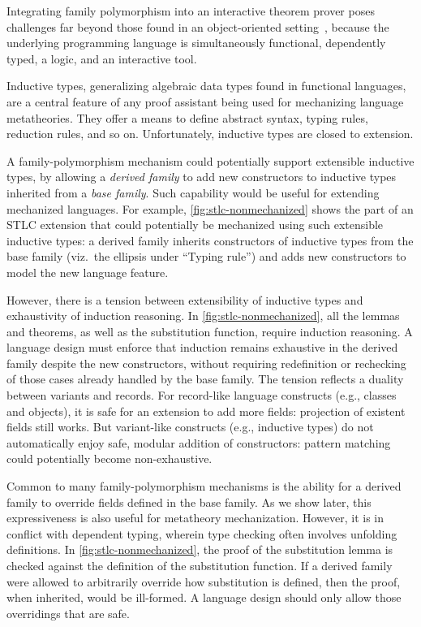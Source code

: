 Integrating family polymorphism into an interactive theorem prover poses challenges
far beyond those found in an object-oriented setting~\cite{ncm2004,vc-calculus-2006,zm2017},
because the underlying programming language is simultaneously
functional, dependently typed, a logic, and an interactive tool.


Inductive types, generalizing algebraic data types found in
functional languages, are a central feature of any proof assistant being
used for mechanizing language metatheories.
They offer a means to define abstract syntax, typing rules, reduction
rules, and so on.
Unfortunately, inductive types are closed to extension.

A family-polymorphism mechanism could potentially support extensible
inductive types, by allowing a \emph{derived family} to add new constructors
to inductive types inherited from a \emph{base family}.
Such capability would be useful for extending mechanized languages.
For example, \cref{fig:stlc-nonmechanized} shows the part of an STLC extension that could
potentially be mechanized using such extensible inductive types: a derived family
inherits constructors of inductive types from the base family (viz.\ the ellipsis under ``Typing rule'')
and adds new constructors to model the new language feature.



However, there is a tension between extensibility of inductive types
and exhaustivity of induction reasoning.
In \cref{fig:stlc-nonmechanized}, all the lemmas and theorems, as well as
the substitution function, require induction reasoning.
A language design must enforce that induction remains exhaustive in the
derived family despite the new constructors, without requiring
redefinition or rechecking of those cases already handled by the base
family.
%
The tension reflects a duality between variants and records.
For record-like language constructs (e.g., classes and objects), it is
safe for an extension to add more fields: projection of existent fields
still works.
But variant-like constructs (e.g., inductive types) do not automatically
enjoy safe, modular addition of constructors:
pattern matching could potentially become non-exhaustive.


Common to many family-polymorphism mechanisms is the ability for a
derived family to override fields defined in the base family.
As we show later, this expressiveness is also useful for metatheory
mechanization.
However, it is in conflict with dependent typing, wherein type checking
often involves unfolding definitions.
In \cref{fig:stlc-nonmechanized}, the proof of the substitution lemma is
checked against the definition of the substitution function.
If a derived family were allowed to arbitrarily override how
substitution is defined, then the proof, when inherited, would be
ill-formed.
A language design should only allow those overridings that are safe.

